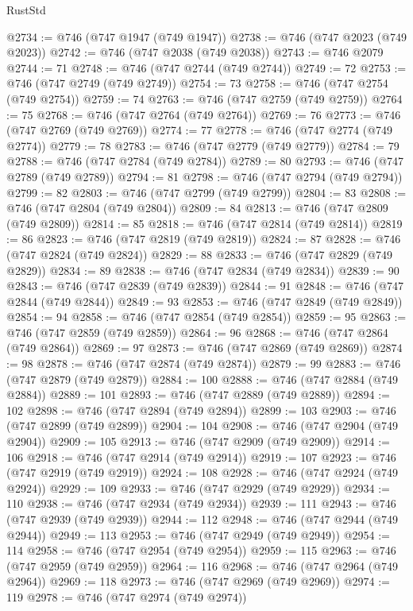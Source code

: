 \begin{lexlean}{RustStd}
\begin{coremodule}
@2734 := @746 (@747 @1947 (@749 @1947))
@2738 := @746 (@747 @2023 (@749 @2023))
@2742 := @746 (@747 @2038 (@749 @2038))
@2743 := @746 @2079
@2744 := 71
@2748 := @746 (@747 @2744 (@749 @2744))
@2749 := 72
@2753 := @746 (@747 @2749 (@749 @2749))
@2754 := 73
@2758 := @746 (@747 @2754 (@749 @2754))
@2759 := 74
@2763 := @746 (@747 @2759 (@749 @2759))
@2764 := 75
@2768 := @746 (@747 @2764 (@749 @2764))
@2769 := 76
@2773 := @746 (@747 @2769 (@749 @2769))
@2774 := 77
@2778 := @746 (@747 @2774 (@749 @2774))
@2779 := 78
@2783 := @746 (@747 @2779 (@749 @2779))
@2784 := 79
@2788 := @746 (@747 @2784 (@749 @2784))
@2789 := 80
@2793 := @746 (@747 @2789 (@749 @2789))
@2794 := 81
@2798 := @746 (@747 @2794 (@749 @2794))
@2799 := 82
@2803 := @746 (@747 @2799 (@749 @2799))
@2804 := 83
@2808 := @746 (@747 @2804 (@749 @2804))
@2809 := 84
@2813 := @746 (@747 @2809 (@749 @2809))
@2814 := 85
@2818 := @746 (@747 @2814 (@749 @2814))
@2819 := 86
@2823 := @746 (@747 @2819 (@749 @2819))
@2824 := 87
@2828 := @746 (@747 @2824 (@749 @2824))
@2829 := 88
@2833 := @746 (@747 @2829 (@749 @2829))
@2834 := 89
@2838 := @746 (@747 @2834 (@749 @2834))
@2839 := 90
@2843 := @746 (@747 @2839 (@749 @2839))
@2844 := 91
@2848 := @746 (@747 @2844 (@749 @2844))
@2849 := 93
@2853 := @746 (@747 @2849 (@749 @2849))
@2854 := 94
@2858 := @746 (@747 @2854 (@749 @2854))
@2859 := 95
@2863 := @746 (@747 @2859 (@749 @2859))
@2864 := 96
@2868 := @746 (@747 @2864 (@749 @2864))
@2869 := 97
@2873 := @746 (@747 @2869 (@749 @2869))
@2874 := 98
@2878 := @746 (@747 @2874 (@749 @2874))
@2879 := 99
@2883 := @746 (@747 @2879 (@749 @2879))
@2884 := 100
@2888 := @746 (@747 @2884 (@749 @2884))
@2889 := 101
@2893 := @746 (@747 @2889 (@749 @2889))
@2894 := 102
@2898 := @746 (@747 @2894 (@749 @2894))
@2899 := 103
@2903 := @746 (@747 @2899 (@749 @2899))
@2904 := 104
@2908 := @746 (@747 @2904 (@749 @2904))
@2909 := 105
@2913 := @746 (@747 @2909 (@749 @2909))
@2914 := 106
@2918 := @746 (@747 @2914 (@749 @2914))
@2919 := 107
@2923 := @746 (@747 @2919 (@749 @2919))
@2924 := 108
@2928 := @746 (@747 @2924 (@749 @2924))
@2929 := 109
@2933 := @746 (@747 @2929 (@749 @2929))
@2934 := 110
@2938 := @746 (@747 @2934 (@749 @2934))
@2939 := 111
@2943 := @746 (@747 @2939 (@749 @2939))
@2944 := 112
@2948 := @746 (@747 @2944 (@749 @2944))
@2949 := 113
@2953 := @746 (@747 @2949 (@749 @2949))
@2954 := 114
@2958 := @746 (@747 @2954 (@749 @2954))
@2959 := 115
@2963 := @746 (@747 @2959 (@749 @2959))
@2964 := 116
@2968 := @746 (@747 @2964 (@749 @2964))
@2969 := 118
@2973 := @746 (@747 @2969 (@749 @2969))
@2974 := 119
@2978 := @746 (@747 @2974 (@749 @2974))

\end{coremodule}
\end{lexlean}
